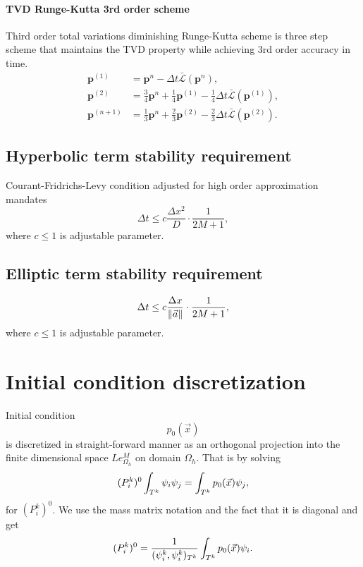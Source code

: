 \paragraph{TVD Runge-Kutta 3rd order scheme}
Third order total variations diminishing Runge-Kutta scheme \cite{Gottlieb2002} 
is three step scheme that maintains the TVD property while achieving 3rd order 
accuracy in time.
\begin{equation}    
    \begin{aligned}
        \mathbf{p}^{(1)} &= \mathbf{p}^n - \Delta t  
        \bar{\mathcal{L}}(\mathbf{p}^n), \\
        \mathbf{\mathbf{p}}^{(2)} &= \frac{3}{4}\mathbf{p}^n 
        +\frac{1}{4}\mathbf{p}^{(1)} - \frac{1}{4}\Delta t 
         \bar{\mathcal{L}}(\mathbf{p}^{(1)}),\\
        \mathbf{p}^{(n+1)} &= \frac{1}{3}\mathbf{p}^n 
        +\frac{2}{3}\mathbf{p}^{(2)} - \frac{2}{3}\Delta t 
         \bar{\mathcal{L}}(\mathbf{p}^{(2)}).
    \end{aligned}
\end{equation}


\subsection{Hyperbolic term stability requirement}
\todo Courant-Fridrichs-Levy condition adjusted for high order approximation 
mandates 
\begin{equation}
    \Delta t \leq c\frac{\Delta x^2}{D} \cdot \frac{1}{2M + 1},
\end{equation} 
where $c \leq 1$ is adjustable parameter.


\subsection{Elliptic term stability requirement}
\todo
\begin{equation}\label{eq:cfl_cond}
    \Delta t \leq c\frac{\Delta x}{\left\lVert\vec{a}\right\rVert} \cdot \frac{1}{2M + 1},
\end{equation}
where $c \leq 1$ is adjustable parameter.

\newpage
\section{Initial condition discretization}
Initial condition 
$$
p_0(\vec{x})
$$
is discretized in straight-forward manner as an orthogonal projection into the 
finite dimensional space $Le_{\Omega_h}^{M}$ on domain $\Omega_h$. That is
by solving
\begin{equation}\label{eq:init_proj}
    (P^k_i)^0\int_{T^k}\psi_i\psi_j = \int_{T^k} p_0(\vec{x})\psi_j,
\end{equation}
for $(P^k_i)^0$. We use the mass matrix notation and the fact that 
it is diagonal and get
\begin{equation}
    (P^k_i)^0 = \frac{1}{(\psi^k_i,\psi^k_i)_{T^k}}\int_{T^k} p_0(\vec{x})\psi_i.
\end{equation}





